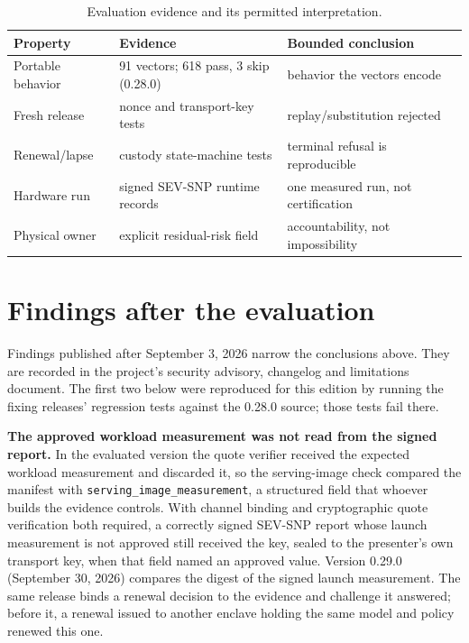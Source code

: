 \documentclass[10pt,letterpaper]{article}
\begin{document}
\begin{table}[h]
\centering
\begin{tabular}{lll}
\toprule
Property & Evidence & Bounded conclusion \\
\midrule
Portable behavior & 91 vectors; 618 pass, 3 skip (0.28.0) & behavior the vectors encode \\
Fresh release & nonce and transport-key tests & replay/substitution rejected \\
Renewal/lapse & custody state-machine tests & terminal refusal is reproducible \\
Hardware run & signed SEV-SNP runtime records & one measured run, not certification \\
Physical owner & explicit residual-risk field & accountability, not impossibility \\
\bottomrule
\end{tabular}
\caption{Evaluation evidence and its permitted interpretation.}
\end{table}

\section{Findings after the evaluation}
\label{sec:after}

Findings published after September 3, 2026 narrow the conclusions above. They are recorded in the project's security advisory, changelog and limitations document. The first two below were reproduced for this edition by running the fixing releases' regression tests against the 0.28.0 source; those tests fail there.

\textbf{The approved workload measurement was not read from the signed report.} In the evaluated version the quote verifier received the expected workload measurement and discarded it, so the serving-image check compared the manifest with \texttt{serving\_image\_measurement}, a structured field that whoever builds the evidence controls. With channel binding and cryptographic quote verification both required, a correctly signed SEV-SNP report whose launch measurement is not approved still received the key, sealed to the presenter's own transport key, when that field named an approved value. Version 0.29.0 (September 30, 2026) compares the digest of the signed launch measurement. The same release binds a renewal decision to the evidence and challenge it answered; before it, a renewal issued to another enclave holding the same model and policy renewed this one.
\end{document}
